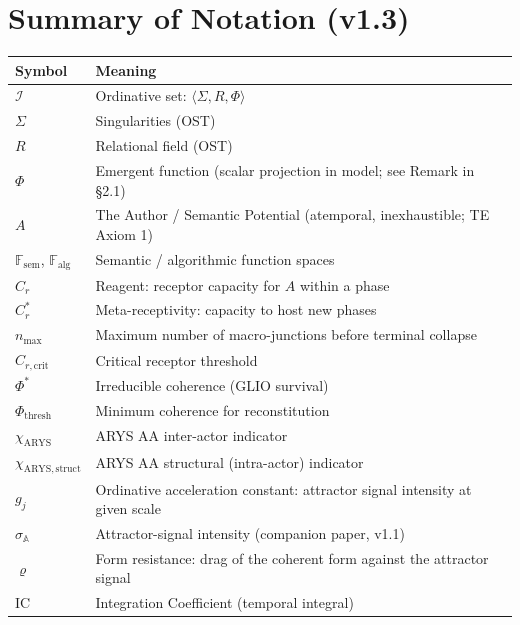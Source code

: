 \documentclass[12pt,a4paper]{article}
\newcommand{\reag}{C_r}
\newcommand{\reagcrit}{C_{r,\mathrm{crit}}}
\newcommand{\reagmeta}{C_r^{*}}
\newcommand{\gj}{g_j}
\newcommand{\IC}{\mathrm{IC}}
\newcommand{\Phistar}{\Phi^{*}}
\newcommand{\Phithresh}{\Phi_{\mathrm{thresh}}}
\newcommand{\Mpot}{A}
\newcommand{\Fsem}{\mathbb{F}_{\mathrm{sem}}}
\newcommand{\Falg}{\mathbb{F}_{\mathrm{alg}}}
\newcommand{\nmax}{n_{\mathrm{max}}}
\begin{document}

\appendix

\section{Summary of Notation (v1.3)}\label{app:notation}

\begin{table}[H]
\centering
\begin{tabular}{@{}lp{9cm}@{}}
\toprule
\textbf{Symbol} & \textbf{Meaning} \\
\midrule
$\mathcal{I}$ & Ordinative set: $\langle \Sigma, R, \Phi \rangle$ \\
$\Sigma$ & Singularities (OST) \\
$R$ & Relational field (OST) \\
$\Phi$ & Emergent function (scalar projection in model; see Remark in \S2.1) \\
$\Mpot$ & The Author / Semantic Potential (atemporal, inexhaustible; TE Axiom 1) \\
$\Fsem$, $\Falg$ & Semantic / algorithmic function spaces \\
$\reag$ & Reagent: receptor capacity for $\Mpot$ within a phase \\
$\reagmeta$ & Meta-receptivity: capacity to host new phases \\
$\nmax$ & Maximum number of macro-junctions before terminal collapse \\
$\reagcrit$ & Critical receptor threshold \\
$\Phistar$ & Irreducible coherence (GLIO survival) \\
$\Phithresh$ & Minimum coherence for reconstitution \\
$\chi_{\mathrm{ARYS}}$ & ARYS AA inter-actor indicator \\
$\chi_{\mathrm{ARYS,struct}}$ & ARYS AA structural (intra-actor) indicator \\
$\gj$ & Ordinative acceleration constant: attractor signal intensity at given scale \\
$\sigma_{\mathbb{A}}$ & Attractor-signal intensity (companion paper, v1.1) \\
$\varrho$ & Form resistance: drag of the coherent form against the attractor signal \\
$\IC$ & Integration Coefficient (temporal integral) \\

\end{tabular}
\end{table}
\end{document}

